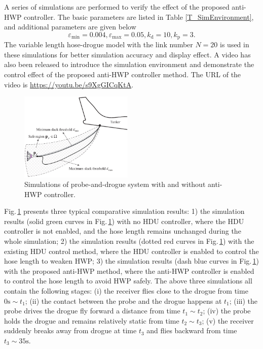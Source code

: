 A series of simulations are performed to verify the effect of the
proposed anti-HWP controller. The basic parameters are listed in Table
\ref{T_SimEnvironment}, and additional parameters are given below
\[
\varepsilon_{\min}=0.004,\varepsilon_{\max}=0.05,k_{\text{d}}=10,k_\text{p}=3.
\]
The variable length hose-drogue model \cite{Wang2014} with the link
number $N=20$ is used in these simulations for better simulation
accuracy and display effect. A video has also been released to introduce
the simulation environment and demonstrate the control effect of the
proposed anti-HWP controller method. The URL of the video is \url{https://youtu.be/s9XgGICqKtA}.

\begin{figure}[ptbh]
	\begin{centering}
		\includegraphics[width=0.48\textwidth]{Figures/Figs_Ch8/Fig17}
		\par\end{centering}
	\caption{Simulations of probe-and-drogue system with and without anti-HWP controller.}
	\label{F_Sim_HWP}
\end{figure}

Fig.\,\ref{F_Sim_HWP} presents three typical comparative simulation
results: 1) the simulation results (solid green curves in Fig.\,\ref{F_Sim_HWP})
with no HDU controller, where the HDU controller is not enabled, and
the hose length remains unchanged during the whole simulation; 2)
the simulation results (dotted red curves in Fig.\,\ref{F_Sim_HWP})
with the existing HDU control method, where the HDU controller is
enabled to control the hose length to weaken HWP; 3) the simulation
results (dash blue curves in Fig.\,\ref{F_Sim_HWP}) with the proposed
anti-HWP method, where the anti-HWP controller is enabled to control
the hose length to avoid HWP safely. The above three simulations all
contain the following stages: (i) the receiver flies close to the
drogue from time $0\text{s}\sim t_{1}$; (ii) the contact between
the probe and the drogue happens at $t_{1}$; (iii) the probe drives
the drogue fly forward a distance from time $t_{1}\sim t_{2}$; (iv)
the probe holds the drogue and remains relatively static from time
$t_{2}\sim t_{3}$; (v) the receiver suddenly breaks away from drogue
at time $t_{3}$ and flies backward from time $t_{3}\sim35\text{s}$.

